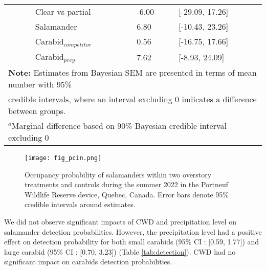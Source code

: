 \begin{table}[ht]
\begin{tabular}{lllll}
                          && Clear vs partial  & -6.00 & [-29.09, 17.26] \\  
                          && Salamander        & \hspace{1mm}6.80 & [-10.43, 23.26] \\ 
                          && Carabid$_{competitor}$      & \hspace{1mm}0.56 & [-16.75, 17.66] \\ 
                          && Carabid$_{prey}$      & \hspace{1mm}7.62 & [-8.93, 24.09] \\ 
      \hline
      \multicolumn{5}{l}{\textbf{Note:} Estimates from Bayesian SEM are presented in terms of mean number with 95\%} \\
      \multicolumn{5}{l}{credible intervals, where an interval excluding 0 indicates a difference between groups.} \\
      \multicolumn{5}{l}{$^{a}$Marginal difference based on 90\% Bayesian credible interval excluding 0}
  \end{tabular}
\end{table}


\clearpage

\begin{figure}[ht]
  \centering
  \texttt{[image: fig\_pcin.png]}
  \caption[Occupancy probability of salamanders under overstory treatments]
  {Occupancy probability of salamanders within two overstory treatments and controls during the summer 2022 in the Portneuf Wildlife Reserve device, Quebec, Canada. 
  Error bars denote 95\% credible intervals around estimates.}
  \label{fig:pcin}
\end{figure}

\vspace{10pt}

We did not observe significant impacts of CWD and precipitation level on salamander detection probabilities. 
However, the precipitation level had a positive effect on detection probability for both small carabids (95\% CI : [0.59, 1.77]) and large carabid (95\% CI : [0.70, 3.23]) (Table \ref{tab:detection}). 
CWD had no significant impact on carabids detection probabilities.


